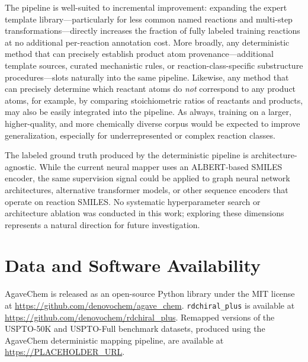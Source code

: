 \documentclass[12pt]{article}
\begin{document}
The pipeline is well-suited to incremental improvement: expanding the expert
template library---particularly for less common named reactions and multi-step
transformations---directly increases the fraction of fully labeled training
reactions at no additional per-reaction annotation cost.  More broadly, any
deterministic method that can precisely establish product atom
provenance---additional template sources, curated mechanistic rules, or
reaction-class-specific substructure procedures---slots naturally into the same
pipeline.  Likewise, any method that can precisely determine which reactant atoms
do \emph{not} correspond to any product atoms, for example, by comparing stoichiometric ratios of reactants and products, may
also be easily integrated into the pipeline.  As always, training on a larger, higher-quality,
and more chemically diverse corpus would be expected to improve
generalization, especially for underrepresented or complex reaction classes.

The labeled ground truth produced by the deterministic pipeline is
architecture-agnostic.  While the current neural mapper uses an ALBERT-based
SMILES encoder, the same supervision signal could be applied to graph neural
network architectures, alternative transformer models, or other sequence
encoders that operate on reaction SMILES.  No systematic hyperparameter search
or architecture ablation was conducted in this work; exploring these dimensions
represents a natural direction for future investigation.


\section*{Data and Software Availability}

AgaveChem is released as an open-source Python library under the MIT
license at \url{https://github.com/denovochem/agave_chem}.
\texttt{rdchiral\_plus} is available at
\url{https://github.com/denovochem/rdchiral_plus}.
Remapped versions of the USPTO-50K and USPTO-Full benchmark datasets,
produced using the AgaveChem deterministic mapping pipeline, are available at
\url{https://PLACEHOLDER\_URL}.



\end{document}
